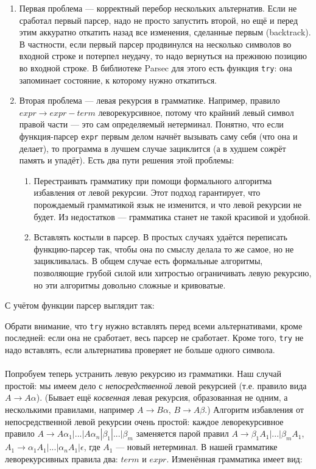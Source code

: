 \documentclass[11pt]{book}
\begin{document}
\begin{enumerate}
\item Первая проблема --- корректный перебор нескольких альтернатив. Если не сработал первый парсер, надо не просто
запустить второй, но ещё и перед этим аккуратно откатить назад все изменения, сделанные первым (backtrack).
В частности, если первый парсер продвинулся на несколько символов во входной строке и потерпел неудачу,
то надо вернуться на прежнюю позицию во входной строке. В библиотеке Parsec для этого есть функция \texttt{\footnotesize try}:
она запоминает состояние, к которому нужно откатиться.
\item Вторая проблема --- левая рекурсия в грамматике. Например, правило $expr \rightarrow expr - term$ леворекурсивное,
потому что крайний левый символ правой части --- это сам определяемый нетерминал.
Понятно, что если функция-парсер \texttt{\footnotesize expr} первым делом начнёт
вызывать саму себя (что она и делает), то программа в лучшем случае зациклится (а в худшем сожрёт память и упадёт).
Есть два пути решения этой проблемы:
    \begin{enumerate}
    \item Перестраивать грамматику при помощи формального алгоритма избавления от левой рекурсии.
    Этот подход гарантирует, что порождаемый грамматикой язык не изменится, и что левой рекурсии
    не будет. Из недостатков --- грамматика станет не такой красивой и удобной.
    \item Вставлять костыли в парсер. В простых случаях удаётся переписать функцию-парсер так,
    чтобы она по смыслу делала то же самое, но не зацикливалась. В общем случае есть формальные
    алгоритмы, позволяющие грубой силой или хитростью ограничивать левую рекурсию, но эти
    алгоритмы довольно сложные и кривоватые.
    \end{enumerate}
\end{enumerate}
С учётом функции  парсер выглядит так:

Обрати внимание, что \texttt{\footnotesize try} нужно вставлять перед всеми альтернативами,
кроме последней: если она не сработает, весь парсер не сработает. Кроме того, \texttt{\footnotesize try}
не надо вставлять, если альтернатива проверяет не больше одного символа.
\\ \\
Попробуем теперь устранить левую рекурсию из грамматики. Наш случай простой: мы имеем дело с
\emph{непосредственной} левой рекурсией (т.е. правило вида $A \rightarrow A \alpha$).
(Бывает ещё \emph{косвенная} левая рекурсия, образованная не одним, а несколькими правилами,
например $A \rightarrow B \alpha$, $B \rightarrow A \beta$.) Алгоритм избавления от непосредственной
левой рекурсии очень простой: каждое леворекурсивное правило $A \rightarrow A \alpha_1 | ... | A \alpha_n | \beta_1 | ... | \beta_m$
заменяется парой правил $A \rightarrow \beta_1 A_1 | ... | \beta_m A_1$,
$A_1 \rightarrow \alpha_1 A_1 | ... | \alpha_n A_1 | \epsilon$, где $A_1$ --- новый нетерминал.
В нашей грамматике леворекурсивных правила два: $term$ и $expr$. Изменённая грамматика
имеет вид:
\end{document}
